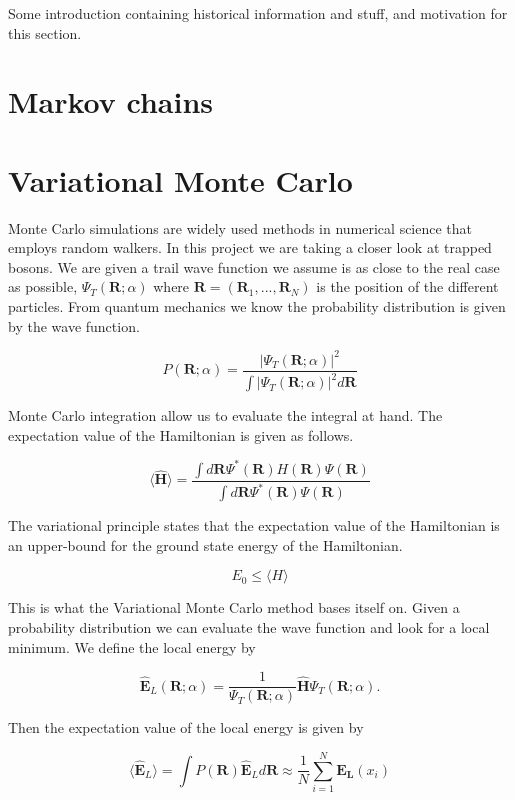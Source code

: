 Some introduction containing historical information and stuff, and motivation for this section.

\section{Markov chains}

\section{Variational Monte Carlo}

Monte Carlo simulations are widely used methods in numerical science that employs random walkers. 
In this project we are taking a closer look at trapped bosons. We are given a trail wave function we assume is as close to the real case as possible, $\Psi_T(\mathbf{R};\alpha)$ where $\mathbf{R} = (\mathbf{R}_1, ... , \mathbf{R}_N)$ is the position of the different particles. 
From quantum mechanics we know the probability distribution is given by the wave function. 

$$P(\mathbf{R}; \alpha) = \frac{|\Psi_T(\mathbf{R};\alpha)|^2}{\int |\Psi_T(\mathbf{R};\alpha)|^2 d\mathbf{R}}$$

Monte Carlo integration allow us to evaluate the integral at hand. The expectation value of the Hamiltonian is given as follows. 

$$\langle \widehat{\mathbf{H}}\rangle = \frac{\int d \mathbf{R} \Psi^{\ast} (\mathbf{R})H(\mathbf{R}) \Psi(\mathbf{R})}{\int d \mathbf{R} \Psi^{\ast} (\mathbf{R}) \Psi(\mathbf{R})}$$

The variational principle states that the expectation value of the Hamiltonian is an upper-bound for the ground state energy of the Hamiltonian.

$$E_0 \leq \langle H \rangle$$

This is what the Variational Monte Carlo method bases itself on. Given a probability distribution we can evaluate the wave function and look for a local minimum. We define the local energy by

$$\widehat{\mathbf{E}}_L(\mathbf{R};\alpha) = \frac{1}{\Psi_T(\mathbf{R};\alpha)}\widehat{\mathbf{H}}\Psi_T(\mathbf{R};\alpha).$$

Then the expectation value of the local energy is given by

$$\langle \widehat{\mathbf{E}}_L\rangle = \int P(\mathbf{R}) \widehat{\mathbf{E}}_L d\mathbf{R} \approx \frac{1}{N} \sum_{i = 1}^N \mathbf{E_L}(x_i)$$

